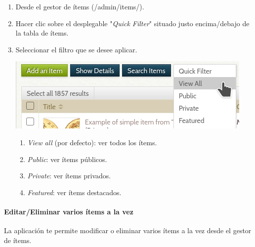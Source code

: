 \documentclass[
]{article}
\providecommand{\tightlist}{%
  \setlength{\itemsep}{0pt}\setlength{\parskip}{0pt}}
\begin{document}
\begin{enumerate}
\def\labelenumi{\arabic{enumi}.}
\item
  Desde el gestor de ítems ({/admin/items/}).
\item
  Hacer clic sobre el desplegable "\emph{Quick Filter}" situado justo
  encima/debajo de la tabla de ítems.
\item
  Seleccionar el filtro que se desee aplicar.

  \includegraphics{../_static/images/search-filter.png}

  \begin{enumerate}
  \def\labelenumii{\alph{enumii}.}
  \tightlist
  \item
    \emph{View all} (por defecto): ver todos los ítems.
  \item
    \emph{Public}: ver ítems públicos.
  \item
    \emph{Private}: ver ítems privados.
  \item
    \emph{Featured}: ver ítems destacados.
  \end{enumerate}
\end{enumerate}

\hypertarget{editareliminar-varios-uxedtems-a-la-vez}{%
\paragraph{Editar/Eliminar varios ítems a la
vez}\label{editareliminar-varios-uxedtems-a-la-vez}}

La aplicación te permite modificar o eliminar varios ítems a la vez
desde el gestor de ítems.
\end{document}
